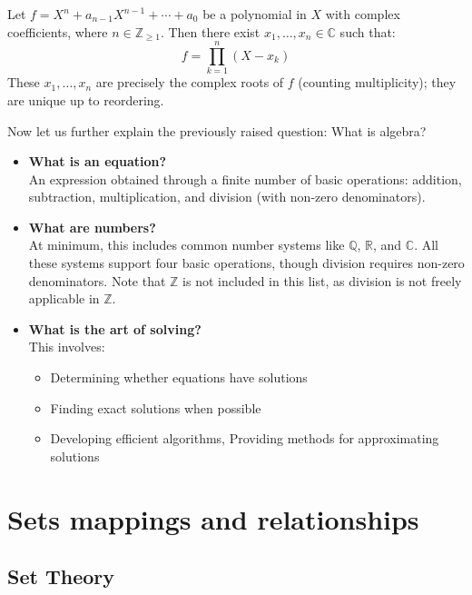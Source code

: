 \documentclass[11pt,lang=en]{elegantbook}
\begin{document}
\begin{theorem}
  Let $f = X^n + a_{n-1}X^{n-1} + \cdots + a_0$ be a polynomial in $X$ with complex coefficients, where $n \in \mathbb{Z}_{\geq 1}$. Then there exist $x_1,\ldots,x_n \in \mathbb{C}$ such that:
  \[
    f = \prod_{k=1}^n (X-x_k)
  \]
  These $x_1,\ldots,x_n$ are precisely the complex roots of $f$ (counting multiplicity); they are unique up to reordering.
\end{theorem}

Now let us further explain the previously raised question: What is algebra?

\begin{itemize}
  \item \textbf{What is an equation?} \\
    An expression obtained through a finite number of basic operations: addition, subtraction, multiplication, and division (with non-zero denominators).

  \item \textbf{What are numbers?} \\
    At minimum, this includes common number systems like $\mathbb{Q}$, $\mathbb{R}$, and $\mathbb{C}$. All these systems support four basic operations, though division requires non-zero denominators. Note that $\mathbb{Z}$ is not included in this list, as division is not freely applicable in $\mathbb{Z}$.

  \item \textbf{What is the art of solving?} \\
    This involves:
    \begin{itemize}
      \item Determining whether equations have solutions
      \item Finding exact solutions when possible
      \item Developing efficient algorithms, Providing methods for approximating solutions
    \end{itemize}
\end{itemize}

\chapter{Sets mappings and relationships}

\section{Set Theory}
\end{document}
